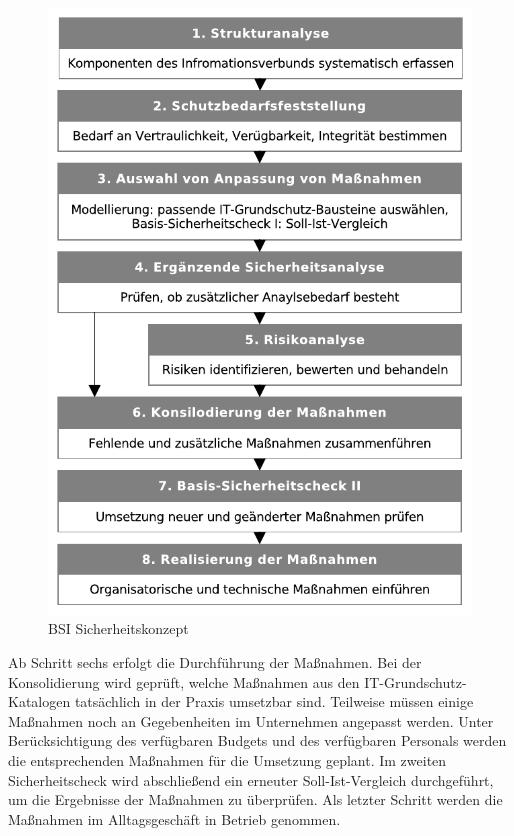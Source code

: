 \documentclass[11pt,a4paper]{report}
\begin{document}
\begin{figure}[htbp]
\centering
\includegraphics[scale=0.7]{images/bsi_sicherheitskonzept.pdf}
\caption[BSI Sicherheitskonzept]{BSI Sicherheitskonzept\footnotemark}
\label{fig:bsi_sicherheit}
\end{figure}
Ab Schritt sechs erfolgt die Durchführung der Maßnahmen. Bei der Konsolidierung wird geprüft, welche Maßnahmen aus den IT-Grundschutz-Katalogen tatsächlich in der Praxis umsetzbar sind. Teilweise müssen einige Maßnahmen noch an Gegebenheiten im Unternehmen angepasst werden. Unter Berücksichtigung des verfügbaren Budgets und des verfügbaren Personals werden die entsprechenden Maßnahmen für die Umsetzung geplant. Im zweiten Sicherheitscheck wird abschließend ein erneuter Soll-Ist-Vergleich durchgeführt, um die Ergebnisse der Maßnahmen zu überprüfen. Als letzter Schritt werden die Maßnahmen im Alltagsgeschäft in Betrieb genommen.
\end{document}
